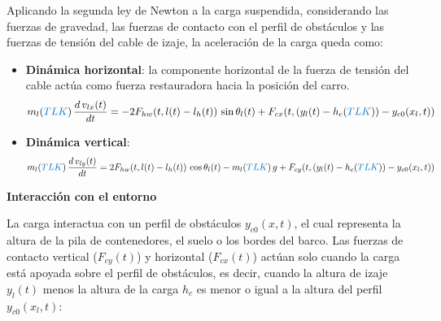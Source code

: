 \documentclass{article}
\begin{document}
Aplicando la segunda ley de Newton a la carga suspendida, considerando las fuerzas de gravedad,
las fuerzas de contacto con el perfil de obstáculos y las fuerzas de tensión del cable de izaje, la aceleración de la carga queda como:
\begin{itemize}
    \item \textbf{Dinámica horizontal}: la componente horizontal de la fuerza de tensión del cable actúa como fuerza restauradora hacia la posición del carro.
    \begin{equation}
        m_l(\textcolor{signalcolor}{TLK}) \, \frac{d \, v_{lx}(t)}{dt} = -2 F_{hw}(t,l(t)-l_h(t)) \, \sin\theta_l(t) + F_{cx}(t, (y_l(t)-h_c(\textcolor{signalcolor}{TLK})) - y_{c0}(x_l,t))
    \end{equation}
    \item \textbf{Dinámica vertical}: 
    \begin{equation}
        m_l(\textcolor{signalcolor}{TLK}) \, \frac{d \, v_{ly}(t)}{dt} = 2 F_{hw}(t,l(t)-l_h(t)) \, \cos\theta_l(t) - m_l(\textcolor{signalcolor}{TLK}) \, g + F_{cy}(t, (y_l(t)-h_c(\textcolor{signalcolor}{TLK})) - y_{c0}(x_l,t))
    \end{equation}
\end{itemize}

\noindent\textbf{Interacción con el entorno}

La carga interactua con un perfil de obstáculos $y_{c0}(x,t)$, el cual representa la altura de la pila de contenedores, el suelo o los bordes del barco.
Las fuerzas de contacto vertical ($F_{cy}(t)$) y horizontal ($F_{cx}(t)$) actúan solo cuando la carga está apoyada sobre el perfil de obstáculos, es decir, cuando la altura 
de izaje $y_l(t)$ menos la altura de la carga $h_c$ es menor o igual a la altura del perfil $y_{c0}(x_l,t)$:
\end{document}
